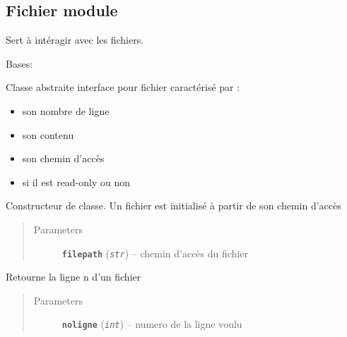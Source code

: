 \documentclass[letterpaper,10pt,english]{sphinxmanual}
\begin{document}
\subsection{Fichier module}
\label{loganalyser:fichier-module}\label{loganalyser:module-loganalyser.fichier}
Sert à intéragir avec les fichiers.

\begin{fulllineitems}
\label{loganalyser:loganalyser.fichier.Fichier}
Bases: 

Classe abstraite interface pour fichier caractérisé par :
\begin{itemize}
\item {} 
son nombre de ligne

\item {} 
son contenu

\item {} 
son chemin d'accès

\item {} 
si il est read-only ou non

\end{itemize}

\begin{fulllineitems}
\label{loganalyser:loganalyser.fichier.Fichier.__init__}
Constructeur de classe. Un fichier est initialisé à partir de son chemin d'accès
\begin{quote}\begin{description}
\item[{Parameters}] \leavevmode
\textbf{\texttt{filepath}} (\emph{\texttt{str}}) -- chemin d'accès du fichier

\end{description}\end{quote}

\end{fulllineitems}


\begin{fulllineitems}
\label{loganalyser:loganalyser.fichier.Fichier.lireligne}
Retourne la ligne n d'un fichier
\begin{quote}\begin{description}
\item[{Parameters}] \leavevmode
\textbf{\texttt{noligne}} (\emph{\texttt{int}}) -- numero de la ligne voulu


\end{description}
\end{quote}
\end{fulllineitems}
\end{fulllineitems}
\end{document}

